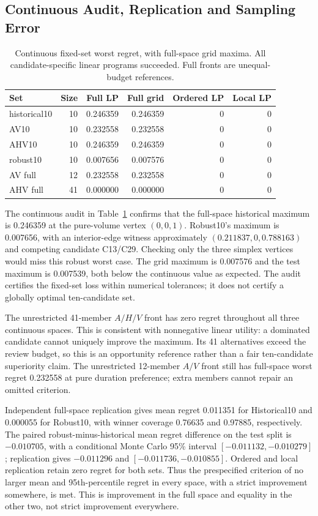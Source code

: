 \documentclass{llncs}
\begin{document}
\subsection{Continuous Audit, Replication and Sampling Error}
\begin{table}[tbp]\caption{Continuous fixed-set worst regret, with full-space grid maxima. All candidate-specific linear programs succeeded. Full fronts are unequal-budget references.}\label{tab:audit}\centering
\small
\begin{tabular}{lrrrrr}\toprule
Set & Size & Full LP & Full grid & Ordered LP & Local LP\\\midrule
historical10 & 10 & 0.246359 & 0.246359 & 0 & 0\\
AV10 & 10 & 0.232558 & 0.232558 & 0 & 0\\
AHV10 & 10 & 0.246359 & 0.246359 & 0 & 0\\
robust10 & 10 & 0.007656 & 0.007576 & 0 & 0\\
AV full & 12 & 0.232558 & 0.232558 & 0 & 0\\
AHV full & 41 & 0.000000 & 0.000000 & 0 & 0\\
\bottomrule\end{tabular}

\end{table}


The continuous audit in Table~\ref{tab:audit} confirms that the full-space historical maximum is 0.246359 at the pure-volume vertex $(0,0,1)$. Robust10's maximum is 0.007656, with an interior-edge witness approximately $(0.211837,0,0.788163)$ and competing candidate C13/C29. Checking only the three simplex vertices would miss this robust worst case. The grid maximum is 0.007576 and the test maximum is 0.007539, both below the continuous value as expected. The audit certifies the fixed-set loss within numerical tolerances; it does not certify a globally optimal ten-candidate set.

The unrestricted 41-member $A/H/V$ front has zero regret throughout all three continuous spaces. This is consistent with nonnegative linear utility: a dominated candidate cannot uniquely improve the maximum. Its 41 alternatives exceed the review budget, so this is an opportunity reference rather than a fair ten-candidate superiority claim. The unrestricted 12-member $A/V$ front still has full-space worst regret 0.232558 at pure duration preference; extra members cannot repair an omitted criterion.

Independent full-space replication gives mean regret 0.011351 for Historical10 and 0.000055 for Robust10, with winner coverage 0.76635 and 0.97885, respectively. The paired robust-minus-historical mean regret difference on the test split is $-0.010705$, with a conditional Monte Carlo 95\% interval $[-0.011132,-0.010279]$; replication gives $-0.011296$ and $[-0.011736,-0.010855]$. Ordered and local replication retain zero regret for both sets. Thus the prespecified criterion of no larger mean and 95th-percentile regret in every space, with a strict improvement somewhere, is met. This is improvement in the full space and equality in the other two, not strict improvement everywhere.
\end{document}
